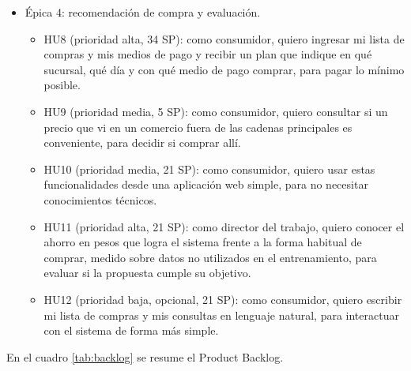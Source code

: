\documentclass[
11pt, %
]{charter}
\begin{document}
\begin{itemize}
\begin{itemize}
		\item HU7 (prioridad alta, 21 SP): como consumidor, quiero que se me alerte cuando una oferta es engañosa (precio inflado antes del descuento, precio anterior inexistente o descuento menor al anunciado), para no tomar decisiones basadas en descuentos falsos.
	\end{itemize}
	\item Épica 4: recomendación de compra y evaluación.
	\begin{itemize}
		\item HU8 (prioridad alta, 34 SP): como consumidor, quiero ingresar mi lista de compras y mis medios de pago y recibir un plan que indique en qué sucursal, qué día y con qué medio de pago comprar, para pagar lo mínimo posible.
		\item HU9 (prioridad media, 5 SP): como consumidor, quiero consultar si un precio que vi en un comercio fuera de las cadenas principales es conveniente, para decidir si comprar allí.
		\item HU10 (prioridad media, 21 SP): como consumidor, quiero usar estas funcionalidades desde una aplicación web simple, para no necesitar conocimientos técnicos.
		\item HU11 (prioridad alta, 21 SP): como director del trabajo, quiero conocer el ahorro en pesos que logra el sistema frente a la forma habitual de comprar, medido sobre datos no utilizados en el entrenamiento, para evaluar si la propuesta cumple su objetivo.
		\item HU12 (prioridad baja, opcional, 21 SP): como consumidor, quiero escribir mi lista de compras y mis consultas en lenguaje natural, para interactuar con el sistema de forma más simple.
	\end{itemize}
\end{itemize}

En el cuadro \ref{tab:backlog} se resume el Product Backlog.
\end{document}
